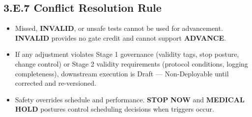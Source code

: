 \documentclass[10pt]{article}
\begin{document}
\clearpage

\subsection*{3.E.7 Conflict Resolution Rule}
{}

\begin{itemize}
\item Missed, \textbf{INVALID}, or unsafe tests cannot be used for advancement. \textbf{INVALID} provides no gate credit and cannot support \textbf{ADVANCE}.
\item If any adjustment violates Stage 1 governance (validity tags, stop posture, change control) or Stage 2 validity requirements (protocol conditions, logging completeness), downstream execution is Draft — Non-Deployable until corrected and re-versioned.
\item Safety overrides schedule and performance. \textbf{STOP} \textbf{NOW} and \textbf{MEDICAL} \textbf{HOLD} postures control scheduling decisions when triggers occur.
\end{itemize}
\end{document}
